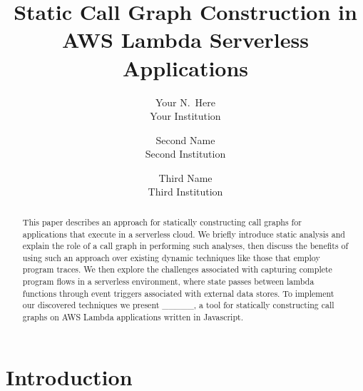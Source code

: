 \documentclass[letterpaper,twocolumn,10pt]{article}
\begin{document}

\date{}

\title{\Large \bf Static Call Graph Construction in AWS Lambda Serverless Applications}

\author{
{\rm Your N.\ Here}\\
Your Institution
\and
{\rm Second Name}\\
Second Institution
\and
{\rm Third Name}\\
Third Institution
} %

\maketitle

\begin{abstract}
 This paper describes an approach for statically constructing call graphs for applications that execute in a serverless cloud. We briefly introduce static analysis and explain the role of a call graph in performing such analyses, then discuss the benefits of using such an approach over existing dynamic techniques like those that employ program traces. We then explore the challenges associated with capturing complete program flows in a serverless environment, where state passes between lambda functions through event triggers associated with external data stores. To implement our discovered techniques we present \_\_\_\_\_, a tool for statically constructing call graphs on AWS Lambda applications written in Javascript.
\end{abstract}


\section{Introduction}
\end{document}
